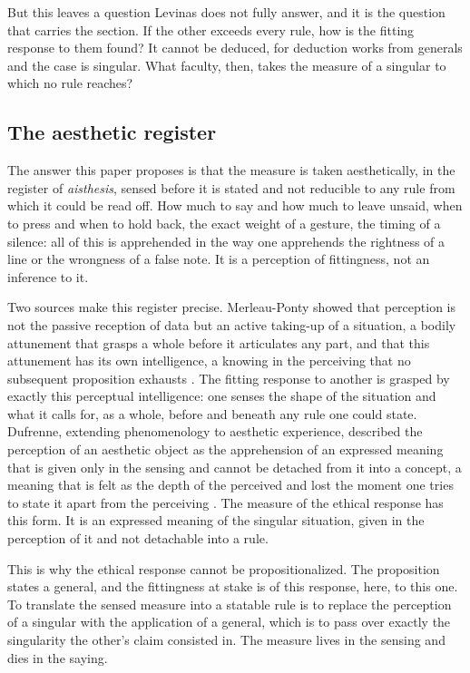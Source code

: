 But this leaves a question Levinas does not fully answer, and it is the question that carries the section. If the other exceeds every rule, how is the fitting response to them found? It cannot be deduced, for deduction works from generals and the case is singular. What faculty, then, takes the measure of a singular to which no rule reaches?

\subsection*{The aesthetic register}

The answer this paper proposes is that the measure is taken aesthetically, in the register of \emph{aisthesis}, sensed before it is stated and not reducible to any rule from which it could be read off. How much to say and how much to leave unsaid, when to press and when to hold back, the exact weight of a gesture, the timing of a silence: all of this is apprehended in the way one apprehends the rightness of a line or the wrongness of a false note. It is a perception of fittingness, not an inference to it.

Two sources make this register precise. Merleau-Ponty showed that perception is not the passive reception of data but an active taking-up of a situation, a bodily attunement that grasps a whole before it articulates any part, and that this attunement has its own intelligence, a knowing in the perceiving that no subsequent proposition exhausts \parencite{merleauponty1962phenomenology}. The fitting response to another is grasped by exactly this perceptual intelligence: one senses the shape of the situation and what it calls for, as a whole, before and beneath any rule one could state. Dufrenne, extending phenomenology to aesthetic experience, described the perception of an aesthetic object as the apprehension of an expressed meaning that is given only in the sensing and cannot be detached from it into a concept, a meaning that is felt as the depth of the perceived and lost the moment one tries to state it apart from the perceiving \parencite{dufrenne1973phenomenology}. The measure of the ethical response has this form. It is an expressed meaning of the singular situation, given in the perception of it and not detachable into a rule.

This is why the ethical response cannot be propositionalized. The proposition states a general, and the fittingness at stake is of this response, here, to this one. To translate the sensed measure into a statable rule is to replace the perception of a singular with the application of a general, which is to pass over exactly the singularity the other's claim consisted in. The measure lives in the sensing and dies in the saying.

